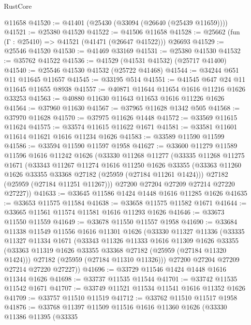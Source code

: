 \begin{lexlean}{RustCore}
\begin{coremodule}
    @11658
@41520 := @41401 (@25430 (@33094 (@26640 (@25439 @11659))))
@41521 := @25380 @41520
@41522 := @41506 @11658
@41528 := @25662 (fun (Γ : @25410) => @41521 (@41471 (@26647 @41522))) @26693
@41529 := @25546 @41520
@41530 := @41469 @33169
@41531 := @25380 @41530
@41532 := @35762 @41522
@41536 := @41529 (@41531 @41532) (@25717 @41400)
@41540 := @25546 @41530 @41532 (@25722 @41468)
@41544 := @34244 @651 @11 @11645 @11657
@41545 := @33195 @514
@41551 := @41545 @647 @24 @11 @11645 @11655 @8938
@41557 := @40871 @11644 @11654 @1616 @11216 @1626 @33253
@41563 := @40880 @11630 @11643 @11653 @1616 @11226 @1626
@41564 := @37960 @11630
@41567 := @37965 @11628 @1342 @505
@41568 := @37970 @11628
@41570 := @37975 @11626 @1448
@41572 := @33569 @11615 @11624
@41575 := @33574 @11615 @11622 @1671
@41581 := @33581 @11601 @11614 @11621 @1616 @11234 @1626
@41583 := @33589 @11590 @11599
@41586 := @33594 @11590 @11597 @1958
@41627 := @33600
    @11279
    @11589
    @11596
    @1616
    @11242
    @1626
    (@33330
      @11268
      @11277
      (@33335
        @11268
        @11275
        @1671
        (@33343
          @11267
          @11274
          @1616
          @11250
          @1626
          @33355
          (@33363 @11260 @1626 @33355 @33368 @27182 (@25959 (@27184 @11261 @1424)))
          @27182
          (@25959 (@27184 @11251 @11267)))
        @27200
        @27204
        @27209
        @27214
        @27220
        @27227))
@41633 := @33645 @11586 @1424 @1448 @1616 @11285 @1626
@41635 := @33653 @11575 @11584
@41638 := @33658 @11575 @11582 @1671
@41644 := @33665 @11561 @11574 @11581 @1616 @11293 @1626
@41646 := @33673 @11550 @11559
@41649 := @33678 @11550 @11557 @1958
@41690 := @33684
    @11338
    @11549
    @11556
    @1616
    @11301
    @1626
    (@33330
      @11327
      @11336
      (@33335
        @11327
        @11334
        @1671
        (@33343
          @11326
          @11333
          @1616
          @11309
          @1626
          @33355
          (@33363 @11319 @1626 @33355 @33368 @27182 (@25959 (@27184 @11320 @1424)))
          @27182
          (@25959 (@27184 @11310 @11326)))
        @27200
        @27204
        @27209
        @27214
        @27220
        @27227))
@41696 := @33729 @11546 @1424 @1448 @1616 @11344 @1626
@41698 := @33737 @11535 @11544
@41701 := @33742 @11535 @11542 @1671
@41707 := @33749 @11521 @11534 @11541 @1616 @11352 @1626
@41709 := @33757 @11510 @11519
@41712 := @33762 @11510 @11517 @1958
@41876 := @33768
    @11397
    @11509
    @11516
    @1616
    @11360
    @1626
    (@33330
      @11386
      @11395
      (@33335

\end{coremodule}
\end{lexlean}
